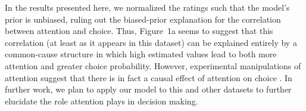 \documentclass[11pt]{article} %
\begin{document}
In the results presented here, we normalized the ratings such that the model's prior is unbiased, ruling out the biased-prior explanation for the correlation between attention and choice. Thus, Figure~1a seems to suggest that this correlation (at least as it appears in this dataset) can be explained entirely by a common-cause structure in which high estimated values lead to both more attention and greater choice probability. However, experimental manipulations of attention suggest that there is in fact a causal effect of attention on choice \citep{Tavares2017}. In further work, we plan to apply our model to this and other datasets to further elucidate the role attention plays in decision making.





% 

\end{document}

